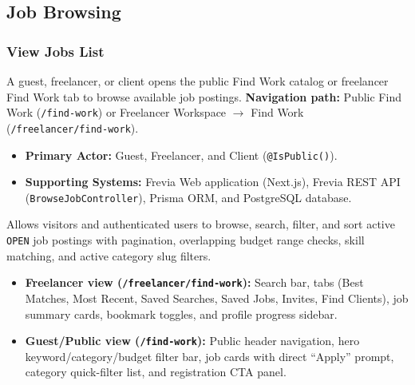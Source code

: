 
\subsection{Job Browsing}

\subsubsection{View Jobs List}

A guest, freelancer, or client opens the public Find Work catalog or freelancer Find Work tab to browse available job postings.\newline
\textbf{Navigation path:} Public Find Work (\texttt{/find-work}) or Freelancer Workspace $\rightarrow$ Find Work (\texttt{/\allowbreak{}freelancer/\allowbreak{}find-\allowbreak{}work}).


\begin{itemize}[leftmargin=1.6em,topsep=3pt,itemsep=2pt,parsep=0pt,label=$\bullet$]
    \item \textbf{Primary Actor:} Guest, Freelancer, and Client (\texttt{@IsPublic()}).
    \item \textbf{Supporting Systems:} Frevia Web application (Next.js), Frevia REST API (\texttt{BrowseJobController}), Prisma ORM, and PostgreSQL database.
\end{itemize}

\noindent Allows visitors and authenticated users to browse, search, filter, and sort active \texttt{OPEN} job postings with pagination, overlapping budget range checks, skill matching, and active category slug filters.

\begin{itemize}[leftmargin=1.6em,topsep=3pt,itemsep=2pt,parsep=0pt,label=$\bullet$]
    \item \textbf{Freelancer view (\texttt{/\allowbreak{}freelancer/\allowbreak{}find-\allowbreak{}work}):} Search bar, tabs (Best Matches, Most Recent, Saved Searches, Saved Jobs, Invites, Find Clients), job summary cards, bookmark toggles, and profile progress sidebar.
    \item \textbf{Guest/Public view (\texttt{/find-work}):} Public header navigation, hero keyword/category/budget filter bar, job cards with direct ``Apply'' prompt, category quick-filter list, and registration CTA panel.
\end{itemize}

